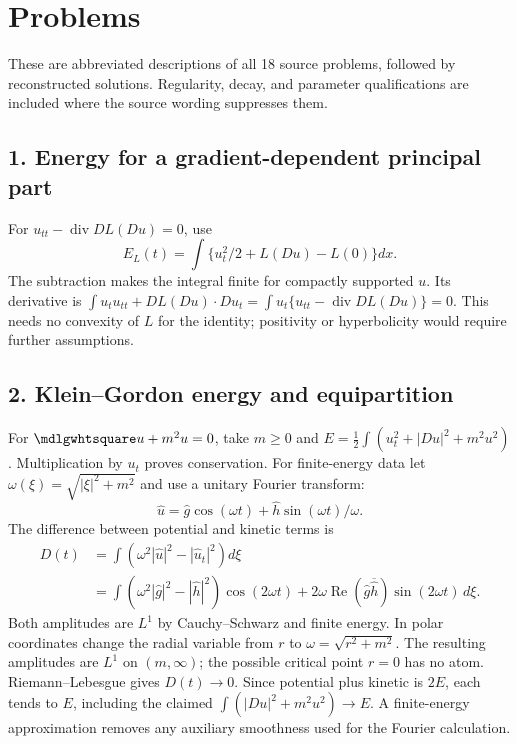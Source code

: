 \section{Problems}
\label{sec:12-6}
These are abbreviated descriptions of all 18 source problems, followed
by reconstructed solutions. Regularity, decay, and parameter
qualifications are included where the source wording suppresses them.

\subsection*{1. Energy for a gradient-dependent principal part}
For $u_{tt}-\operatorname{div}DL(Du)=0$, use
\[
 E_L(t)=\int\{u_t^2/2+L(Du)-L(0)\}dx.
\]
The subtraction makes the integral finite for compactly supported $u$.
Its derivative is $\int u_tu_{tt}+DL(Du)\cdot Du_t
=\int u_t\{u_{tt}-\operatorname{div}DL(Du)\}=0$.
This needs no convexity of $L$ for the identity; positivity or
hyperbolicity would require further assumptions.

\subsection*{2. Klein--Gordon energy and equipartition}
For $\PDEWave u+m^2u=0$, take $m\ge0$ and
$E=\frac12\int(u_t^2+|Du|^2+m^2u^2)$. Multiplication by $u_t$
proves conservation. For finite-energy data let
$\omega(\xi)=\sqrt{|\xi|^2+m^2}$ and use a unitary Fourier transform:
\[
 \widehat u=\widehat g\cos(\omega t)
                   +\widehat h\sin(\omega t)/\omega.
\]
The difference between potential and kinetic terms is
\[
 \begin{split}
 D(t)&=\int(\omega^2|\widehat u|^2-|\widehat u_t|^2)d\xi\\
 &=\int(\omega^2|\widehat g|^2-|\widehat h|^2)\cos(2\omega t)
       +2\omega\operatorname{Re}(\widehat g\overline{\widehat h})
                                      \sin(2\omega t)\,d\xi.
 \end{split}
\]
Both amplitudes are $L^1$ by Cauchy--Schwarz and finite energy.
In polar coordinates change the radial variable from $r$ to
$\omega=\sqrt{r^2+m^2}$. The resulting amplitudes are $L^1$ on
$(m,\infty)$; the possible critical point $r=0$ has no atom.
Riemann--Lebesgue gives $D(t)\to0$. Since potential plus kinetic
is $2E$, each tends to $E$, including the claimed
$\int(|Du|^2+m^2u^2)\to E$. A finite-energy approximation removes
any auxiliary smoothness used for the Fourier calculation.

